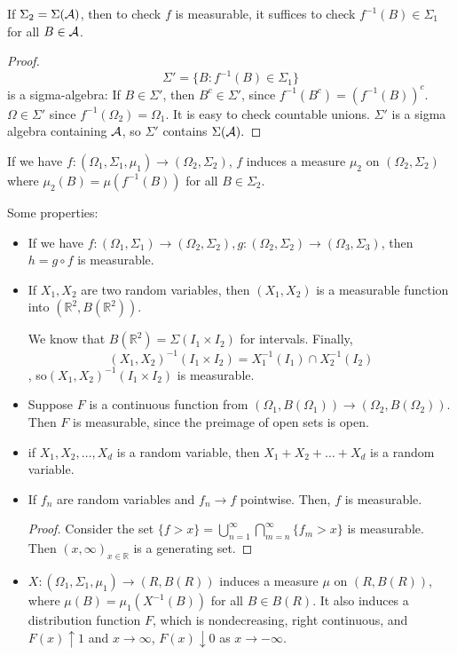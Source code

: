 \documentclass[11pt]{scrartcl}
\newcommand{\R}{\mathbb{R}}
\begin{document}
\begin{proposition} If $\Sigma_2 = \Sigma(\mathcal A)$, then to check $f$ is measurable, it suffices to check $f^{-1}(B) \in \Sigma_1$ for all $B \in \mathcal A$.
\end{proposition}
\begin{proof}
$$\Sigma' = \{B : f^{-1}(B) \in \Sigma_1\}$$ is a sigma-algebra: If $B \in \Sigma'$, then $B^c \in \Sigma'$, since $f^{-1}(B^c) = (f^{-1}(B))^c$.  $\Omega \in \Sigma'$ since $f^{-1}(\Omega_2) = \Omega_1$.  It is easy to check countable unions.  $\Sigma'$ is a sigma algebra containing $\mathcal A$, so $\Sigma'$ contains $\Sigma(\mathcal A).$  
\end{proof}

\begin{fact} If we have $f: (\Omega_1, \Sigma_1, \mu_1) \rightarrow (\Omega_2, \Sigma_2)$, $f$ induces a measure $\mu_2$ on $(\Omega_2, \Sigma_2)$ where $\mu_2(B) = \mu(f^{-1}(B))$ for all $B \in \Sigma_2$.
\end{fact}

Some properties:
\begin{itemize}
\item If we have $f: (\Omega_1, \Sigma_1) \rightarrow  (\Omega_2, \Sigma_2), g:  (\Omega_2, \Sigma_2)\rightarrow (\Omega_3, \Sigma_3)$, then $h = g \circ f$ is measurable. 
\item If $X_1, X_2$ are two random variables, then $(X_1, X_2)$ is a measurable function into $(\R^2, B(\R^2))$.

We know that $B(\R^2) = \Sigma(I_1 \times I_2)$ for intervals.  Finally, $$(X_1, X_2)^{-1}(I_1 \times I_2) = X_1^{-1}(I_1) \cap X_2^{-1}(I_2)$$, so$ (X_1, X_2)^{-1}(I_1 \times I_2)$ is measurable.
\item Suppose $F$ is a continuous function from $(\Omega_1, B(\Omega_1)) \rightarrow (\Omega_2, B(\Omega_2))$. Then $F$ is measurable, since the preimage of open sets is open.
\item if $X_1, X_2, \dots, X_d$ is a random variable, then $X_1 + X_2 + \dots + X_d$ is a random variable.
\item If $f_n$ are random variables and $f_n \rightarrow f$ pointwise.  Then, $f$ is measurable.
\begin{proof}
Consider the set $\{f > x\} = \bigcup_{n=1}^{\infty}\bigcap_{m = n}^{\infty} \{f_m > x\}$ is measurable.  Then $(x, \infty)_{x \in \R}$ is a generating set.
\end{proof}
\item$ X: (\Omega_1, \Sigma_1, \mu_1) \rightarrow (R, B(R))$ induces a measure $\mu$ on $(R, B(R))$, where $\mu(B) = \mu_1(X^{-1}(B))$ for all $B \in B(R)$.  It also induces a distribution function $F$, which is nondecreasing, right continuous, and $F(x) \uparrow 1$ and $x \rightarrow \infty$, $F(x) \downarrow 0$ as $x \rightarrow -\infty$.  
\end{itemize}
\end{document}
